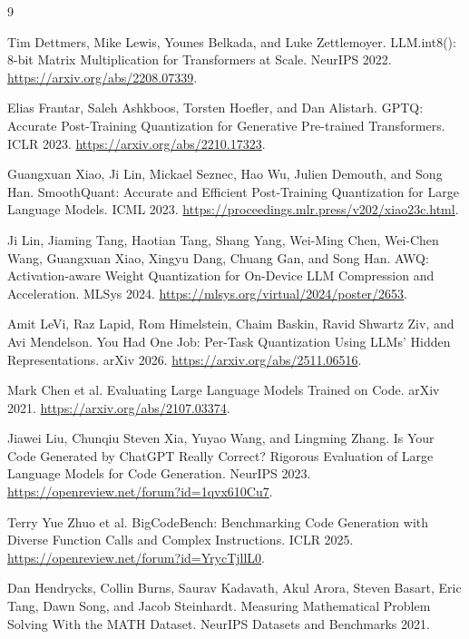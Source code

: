 \documentclass{article}
\begin{document}
\begin{thebibliography}{9}

Tim Dettmers, Mike Lewis, Younes Belkada, and Luke Zettlemoyer.
\newblock LLM.int8(): 8-bit Matrix Multiplication for Transformers at Scale.
\newblock NeurIPS 2022. \url{https://arxiv.org/abs/2208.07339}.

Elias Frantar, Saleh Ashkboos, Torsten Hoefler, and Dan Alistarh.
\newblock GPTQ: Accurate Post-Training Quantization for Generative Pre-trained Transformers.
\newblock ICLR 2023. \url{https://arxiv.org/abs/2210.17323}.

Guangxuan Xiao, Ji Lin, Mickael Seznec, Hao Wu, Julien Demouth, and Song Han.
\newblock SmoothQuant: Accurate and Efficient Post-Training Quantization for Large Language Models.
\newblock ICML 2023. \url{https://proceedings.mlr.press/v202/xiao23c.html}.

Ji Lin, Jiaming Tang, Haotian Tang, Shang Yang, Wei-Ming Chen, Wei-Chen Wang, Guangxuan Xiao, Xingyu Dang, Chuang Gan, and Song Han.
\newblock AWQ: Activation-aware Weight Quantization for On-Device LLM Compression and Acceleration.
\newblock MLSys 2024. \url{https://mlsys.org/virtual/2024/poster/2653}.

Amit LeVi, Raz Lapid, Rom Himelstein, Chaim Baskin, Ravid Shwartz Ziv, and Avi Mendelson.
\newblock You Had One Job: Per-Task Quantization Using LLMs' Hidden Representations.
\newblock arXiv 2026. \url{https://arxiv.org/abs/2511.06516}.

Mark Chen et al.
\newblock Evaluating Large Language Models Trained on Code.
\newblock arXiv 2021. \url{https://arxiv.org/abs/2107.03374}.

Jiawei Liu, Chunqiu Steven Xia, Yuyao Wang, and Lingming Zhang.
\newblock Is Your Code Generated by ChatGPT Really Correct? Rigorous Evaluation of Large Language Models for Code Generation.
\newblock NeurIPS 2023. \url{https://openreview.net/forum?id=1qvx610Cu7}.

Terry Yue Zhuo et al.
\newblock BigCodeBench: Benchmarking Code Generation with Diverse Function Calls and Complex Instructions.
\newblock ICLR 2025. \url{https://openreview.net/forum?id=YrycTjllL0}.

Dan Hendrycks, Collin Burns, Saurav Kadavath, Akul Arora, Steven Basart, Eric Tang, Dawn Song, and Jacob Steinhardt.
\newblock Measuring Mathematical Problem Solving With the MATH Dataset.
\newblock NeurIPS Datasets and Benchmarks 2021.

\end{thebibliography}
\end{document}

